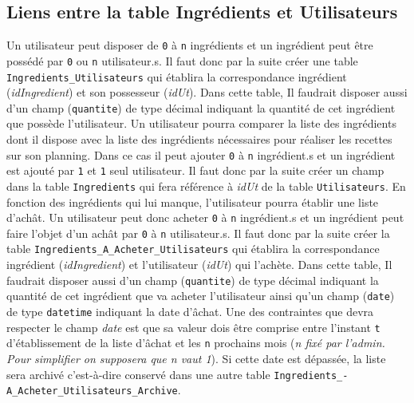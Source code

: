 \subsection{Liens entre la table Ingrédients et Utilisateurs}
Un utilisateur peut disposer de \texttt{0} à \texttt{n} ingrédients et un ingrédient peut être possédé par \texttt{0} ou \texttt{n} utilisateur.s. Il faut donc par la suite créer une table \texttt{Ingredients\_Utilisateurs} qui établira la correspondance ingrédient (\textit{idIngredient}) et son possesseur (\textit{idUt}).
Dans cette table, Il faudrait disposer aussi d'un champ (\texttt{quantite}) de type décimal indiquant la quantité de cet ingrédient que possède l'utilisateur.
\newline
Un utilisateur pourra comparer la liste des ingrédients dont il dispose avec la liste des ingrédients nécessaires pour réaliser les recettes sur son planning. Dans ce cas il peut ajouter \texttt{0} à \texttt{n} ingrédient.s et un ingrédient est ajouté par \texttt{1} et \texttt{1} seul utilisateur. 
\newline
Il faut donc par la suite créer un champ dans la table \texttt{Ingredients} qui fera référence à \textit{idUt} de la table \texttt{Utilisateurs}.
\newline
En fonction des ingrédients qui lui manque, l'utilisateur pourra établir une liste d'achât. Un utilisateur peut donc acheter \texttt{0} à \texttt{n} ingrédient.s et un ingrédient peut faire l'objet d'un achât par \texttt{0} à \texttt{n} utilisateur.s. Il faut donc par la suite créer la table \texttt{Ingredients\_A\_Acheter\_Utilisateurs} qui établira la correspondance ingrédient (\textit{idIngredient}) et l'utilisateur (\textit{idUt}) qui l'achète.
\newline
Dans cette table, Il faudrait disposer aussi d'un champ (\texttt{quantite}) de type décimal indiquant la quantité de cet ingrédient que va acheter l'utilisateur ainsi qu'un champ (\texttt{date}) de type \texttt{datetime} indiquant la date d'âchat.
\newline
Une des contraintes que devra respecter le champ \textit{date} est que sa valeur dois être comprise entre l'instant \texttt{t} d'établissement de la liste d'âchat et les \texttt{n} prochains mois (\textit{n fixé par l'admin. Pour simplifier on supposera que n vaut 1}). 
\newline
Si cette date est dépassée, la liste sera archivé c'est-à-dire conservé dans une autre table \texttt{Ingredients\_-
A\_Acheter\_Utilisateurs\_Archive}.


